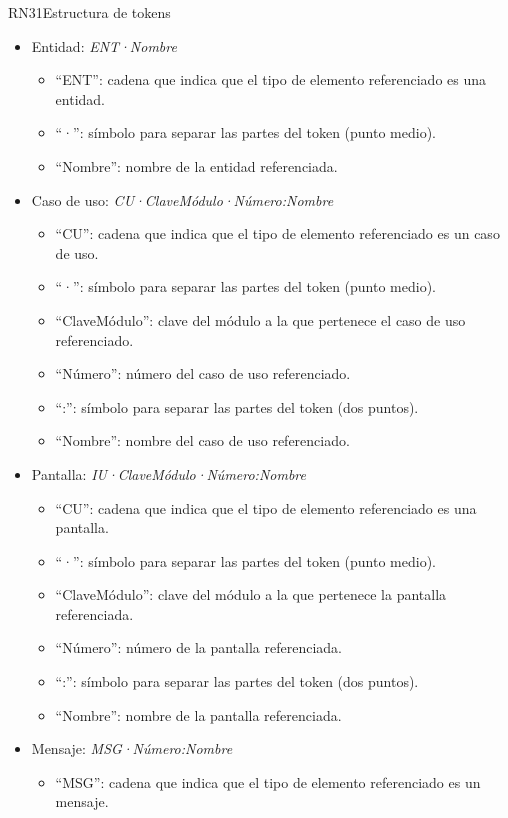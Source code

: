 \begin{BusinessRule}{RN31}{Estructura de tokens}
{\begin{itemize}
			\item Entidad: {\it ENT·Nombre}
				\begin{itemize}
					\item ``ENT'': cadena que indica que el tipo de elemento referenciado es una entidad.
					\item ``·'': símbolo para separar las partes del token (punto medio).
					\item ``Nombre'': nombre de la entidad referenciada.
				\end{itemize}
			\item Caso de uso: {\it CU·ClaveMódulo·Número:Nombre}
				\begin{itemize}
					\item ``CU'': cadena que indica que el tipo de elemento referenciado es un caso de uso.
					\item ``·'': símbolo para separar las partes del token (punto medio).
					\item ``ClaveMódulo'': clave del módulo a la que pertenece el caso de uso referenciado.
					\item ``Número'': número del caso de uso referenciado.
					\item ``:'': símbolo para separar las partes del token (dos puntos).
					\item ``Nombre'': nombre del caso de uso referenciado.
				\end{itemize}
			\item Pantalla: {\it IU·ClaveMódulo·Número:Nombre}
				\begin{itemize}
					\item ``CU'': cadena que indica que el tipo de elemento referenciado es una pantalla.
					\item ``·'': símbolo para separar las partes del token (punto medio).
					\item ``ClaveMódulo'': clave del módulo a la que pertenece la pantalla referenciada.
					\item ``Número'': número de la pantalla referenciada.
					\item ``:'': símbolo para separar las partes del token (dos puntos).
					\item ``Nombre'': nombre de la pantalla referenciada.
				\end{itemize}
			\item Mensaje: {\it MSG·Número:Nombre}
				\begin{itemize}
					\item ``MSG'': cadena que indica que el tipo de elemento referenciado es un mensaje.

\end{itemize}
\end{itemize}}
\end{BusinessRule}
